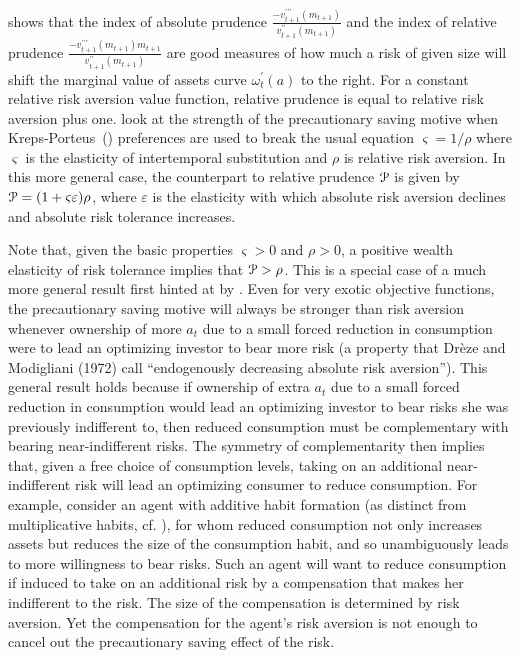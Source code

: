 \cite{kimball:smallandlarge} shows that the index of absolute prudence
$\frac{-{v}^{\prime\prime\prime}_{t+1}(m_{t+1})}{{v}^{\prime\prime}_{t+1}(m_{t+1})}$
and the index of relative prudence
$\frac{-{v}^{\prime\prime\prime}_{t+1}(m_{t+1})
  m_{t+1}}{{v}^{\prime\prime}_{t+1}(m_{t+1})}$ are good measures of
how much a risk of given size will shift the marginal value of assets
curve $\omega_{t}^{\prime}(a)$ to the right.  For a constant relative
risk aversion value function, relative prudence is equal to relative
risk aversion plus one.  \cite{KimballWeil:Poss} look at the strength
of the precautionary saving motive when
Kreps-Porteus~(\citeyear{KrepsPorteus:Prefs}) preferences are used to
break the usual equation $\varsigma = 1/\rho$ where $\varsigma$ is the
elasticity of intertemporal substitution and $\rho$ is relative risk
aversion.  In this more general case, the counterpart to relative
prudence ${\cal P}$ is given by ${\cal P} = (1 + \varsigma
\varepsilon) \rho$, where $\varepsilon$ is the elasticity with which
absolute risk aversion declines and absolute risk tolerance increases.

Note that, given the basic properties $\varsigma>0$ and $\rho > 0$, a
positive wealth elasticity of risk tolerance implies that ${\cal P} >
\rho$.  This is a special case of a much more general result first
hinted at by \cite{DrezeModigliani}.  Even for very exotic objective
functions, the precautionary saving motive will always be stronger
than risk aversion whenever ownership of more $a_{t}$ due to a small
forced reduction in consumption were to lead an optimizing investor to
bear more risk (a property that Dr\`eze and Modigliani (1972) call
``endogenously decreasing absolute risk aversion''). This general
result holds because if ownership of extra $a_{t}$ due to a small
forced reduction in consumption would lead an optimizing investor to
bear risks she was previously indifferent to, then reduced consumption
must be complementary with bearing near-indifferent risks. The
symmetry of complementarity then implies that, given a free choice of
consumption levels, taking on an additional near-indifferent risk will
lead an optimizing consumer to reduce consumption. For example,
consider an agent with additive habit formation (as distinct from
multiplicative habits, cf. \cite{carroll:solvinghabits}), for whom
reduced consumption not only increases assets but reduces the size of
the consumption habit, and so unambiguously leads to more willingness
to bear risks.  Such an agent will want to reduce consumption if
induced to take on an additional risk by a compensation that makes her
indifferent to the risk.  The size of the compensation is determined
by risk aversion.  Yet the compensation for the agent's risk aversion
is not enough to cancel out the precautionary saving effect of the
risk.


